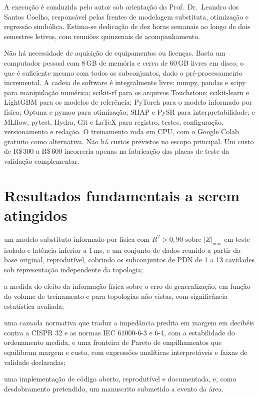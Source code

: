 A execução é conduzida pelo autor sob orientação do Prof.\ Dr.\ Leandro dos Santos
Coelho, responsável pelas frentes de modelagem substituta, otimização e regressão
simbólica. Estima-se dedicação de dez horas semanais ao longo de dois semestres
letivos, com reuniões quinzenais de acompanhamento.

Não há necessidade de aquisição de equipamentos ou licenças. Basta um computador
pessoal com 8\,GB de memória e cerca de 60\,GB livres em disco, o que é suficiente
mesmo com todos os subconjuntos, dado o pré-processamento incremental. A cadeia de
software é integralmente livre: numpy, pandas e scipy para manipulação numérica;
scikit-rf para os arquivos Touchstone; scikit-learn e LightGBM para os modelos de
referência; PyTorch para o modelo informado por física; Optuna e pymoo para
otimização; SHAP e PySR para interpretabilidade; e MLflow, pytest, Hydra, Git e
\LaTeX{} para registro, testes, configuração, versionamento e redação. O treinamento
roda em CPU, com o Google Colab gratuito como alternativa. Não há custos previstos no
escopo principal. Um custo de R\$\,300 a R\$\,600 incorreria apenas na fabricação das
placas de teste da validação complementar.

\section{Resultados fundamentais a serem atingidos}
\label{sec:resultados}

\begin{alineas}
\item um modelo substituto informado por física com $R^2 > 0{,}90$ sobre
$|Z|_{\max}$ em teste isolado e latência inferior a 1\,ms, e um conjunto de dados
reunido a partir da base original, reprodutível, cobrindo os subconjuntos de PDN de
1 a 13 cavidades sob representação independente da topologia;

\item a medida do efeito da informação física sobre o erro de generalização, em
função do volume de treinamento e para topologias não vistas, com significância
estatística avaliada;

\item uma camada normativa que traduz a impedância predita em margem em decibéis
contra a CISPR 32 e as normas IEC 61000-6-3 e 6-4, com a estabilidade do ordenamento
medida, e uma fronteira de Pareto de empilhamentos que equilibram margem e custo,
com expressões analíticas interpretáveis e faixas de validade declaradas;

\item uma implementação de código aberto, reprodutível e documentada, e, como
desdobramento pretendido, um manuscrito submetido a evento da área.
\end{alineas}

